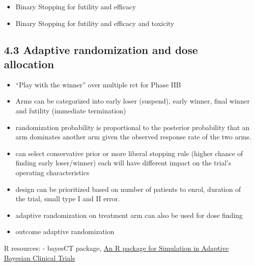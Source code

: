 \documentclass[
]{article}
\providecommand{\tightlist}{%
  \setlength{\itemsep}{0pt}\setlength{\parskip}{0pt}}
\begin{document}
\begin{itemize}
\tightlist
\item
  Binary Stopping for futility and efficacy
\item
  Binary Stopping for futility and efficacy and toxicity
\end{itemize}

\hypertarget{adaptive-randomization-and-dose-allocation}{%
\subsection{4.3 Adaptive randomization and dose
allocation}\label{adaptive-randomization-and-dose-allocation}}

\begin{itemize}
\item
  ``Play with the winner'' over multiple rct for Phase IIB
\item
  Arms can be categorized into early loser (suspend), early winner,
  final winner and futility (immediate termination)
\item
  randomization probability is proportional to the posterior probability
  that an arm dominates another arm given the observed response rate of
  the two arms.
\item
  can select conservative prior or more liberal stopping rule (higher
  chance of finding early loser/winner) each will have different impact
  on the trial's operating characteristics
\item
  design can be prioritized based on number of patients to enrol,
  duration of the trial, small type I and II error.
\item
  adaptive randomization on treatment arm can also be used for dose
  finding
\item
  outcome adaptive randomization
\end{itemize}

R resources: - bayesCT package,
\href{https://cran.r-project.org/web/packages/bayesCT/vignettes/bayesCT.html}{An
R package for Simulation in Adaptive Bayesian Clinical Trials}
\end{document}
